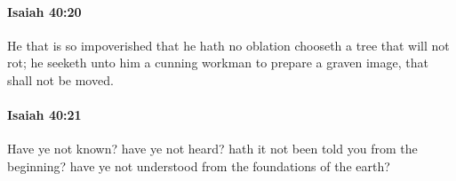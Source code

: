 		\paragraph{Isaiah 40:20} %
			\label{ISAIAH-40-20}

			He that is so impoverished that he hath no oblation chooseth a tree that will not rot; he seeketh unto him a cunning workman to prepare a graven image, that shall not be moved.


		\paragraph{Isaiah 40:21} %
			\label{ISAIAH-40-21}

			Have ye not known? have ye not heard? hath it not been told you from the beginning? have ye not understood from the foundations of the earth?


